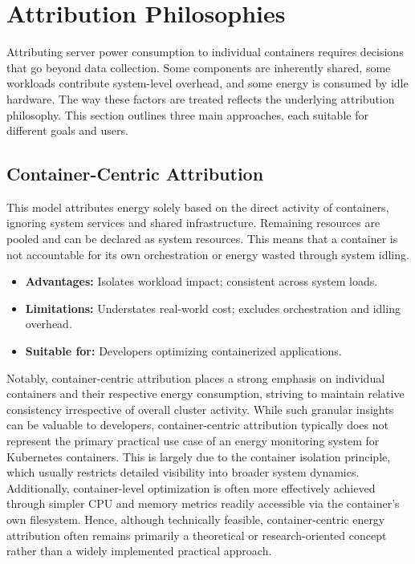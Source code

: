 \section{Attribution Philosophies}
\label{sec:attribution-philosophies}

Attributing server power consumption to individual containers requires decisions that go beyond data collection. Some components are inherently shared, some workloads contribute system-level overhead, and some energy is consumed by idle hardware. The way these factors are treated reflects the underlying attribution philosophy. This section outlines three main approaches, each suitable for different goals and users.

\subsection{Container-Centric Attribution}
\label{sec:container-centric}

This model attributes energy solely based on the direct activity of containers, ignoring system services and shared infrastructure. Remaining resources are pooled and can be declared as system resources. This means that a container is not accountable for its own orchestration or energy wasted through system idling.

\begin{itemize}
    \item \textbf{Advantages:} Isolates workload impact; consistent across system loads.
    \item \textbf{Limitations:} Understates real-world cost; excludes orchestration and idling overhead.
    \item \textbf{Suitable for:} Developers optimizing containerized applications.
\end{itemize}

Notably, container-centric attribution places a strong emphasis on individual containers and their respective energy consumption, striving to maintain relative consistency irrespective of overall cluster activity. While such granular insights can be valuable to developers, container-centric attribution typically does not represent the primary practical use case of an energy monitoring system for Kubernetes containers. This is largely due to the container isolation principle, which usually restricts detailed visibility into broader system dynamics. Additionally, container-level optimization is often more effectively achieved through simpler CPU and memory metrics readily accessible via the container’s own  filesystem. Hence, although technically feasible, container-centric energy attribution often remains primarily a theoretical or research-oriented concept rather than a widely implemented practical approach.

